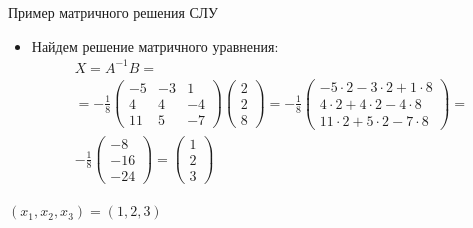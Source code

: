 \documentclass[unicode,11pt,notheorems]{beamer}
\begin{document}
\begin{frame}[allowframebreaks]{Пример матричного решения СЛУ}
\begin{itemize}
	\framebreak
	\item 
		Найдем решение матричного уравнения:	
		\begin{multline*}
			X=A^{-1}B 
			=\\
			= -\frac{1}{8}
			\begin{pmatrix}
				-5 & -3 & 1\\
				4 & 4 & -4\\
				11 & 5 & -7
			\end{pmatrix}
			\begin{pmatrix}
				2 \\
				2 \\
				8 
			\end{pmatrix}
			=
			-\frac{1}{8}\begin{pmatrix}
				-5\cdot 2-3\cdot 2 + 1\cdot 8\\
				4\cdot 2 + 4\cdot 2  -4\cdot 8\\
				11\cdot 2 + 5\cdot 2 -7\cdot 8
			\end{pmatrix}
			=\\
			-\frac{1}{8}\begin{pmatrix}
				-8\\
				-16\\
				-24
			\end{pmatrix}
			=
			\begin{pmatrix}
				1\\
				2\\
				3
			\end{pmatrix}
		\end{multline*}
	\end{itemize}
	 \alert{$(x_1,x_2,x_3)= (1,2,3)$}
\end{frame}
\end{document}

